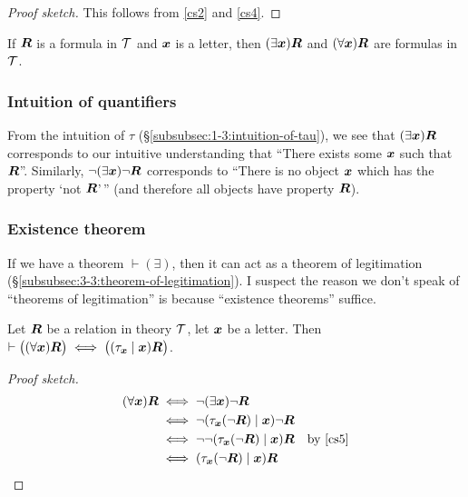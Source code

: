 \begin{proof}[Proof sketch]
This follows from \ref{cs2} and \ref{cs4}.
\end{proof}

\begin{cf}\label{cf11}
If $\boldsymbol{R}$ is a formula in $\mathcal{T}$ and
$\boldsymbol{x}$ is a letter, then
$(\exists\boldsymbol{x})\boldsymbol{R}$ and
$(\forall\boldsymbol{x})\boldsymbol{R}$ are formulas in $\mathcal{T}$.
\end{cf}

\subsubsection{Intuition of quantifiers}
From the intuition of $\tau$ (\S\ref{subsubsec:1-3:intuition-of-tau}),
we see that $(\exists\boldsymbol{x})\boldsymbol{R}$ corresponds to
our intuitive understanding that ``There exists some $\boldsymbol{x}$
such that $\boldsymbol{R}$''. Similarly,
$\neg(\exists\boldsymbol{x})\neg\boldsymbol{R}$ corresponds to
``There is no object $\boldsymbol{x}$ which has the property `not
$\boldsymbol{R}$'\,'' (and therefore all objects have property
$\boldsymbol{R}$).

\subsubsection{Existence theorem}\label{subsubsec:4-1:existence-thms}
If we have a theorem $\vdash(\exists)$, then it can act as a theorem of
legitimation (\S\ref{subsubsec:3-3:theorem-of-legitimation}). I suspect
the reason we don't speak of ``theorems of legitimation'' is because
``existence theorems'' suffice.

\begin{dc}\label{c26}
Let $\boldsymbol{R}$ be a relation in theory $\mathcal{T}$, let
$\boldsymbol{x}$ be a letter. Then $\vdash\bigl((\forall\boldsymbol{x})\boldsymbol{R}\bigr)\iff\bigl((\tau_{\boldsymbol{x}}\mid\boldsymbol{x})\boldsymbol{R}\bigr)$.
\end{dc}

\begin{proof}[Proof sketch]
\begin{align*}
(\forall\boldsymbol{x})\boldsymbol{R} &\iff\neg(\exists\boldsymbol{x})\neg\boldsymbol{R}\\
&\iff\neg(\tau_{\boldsymbol{x}}(\neg\boldsymbol{R})\mid\boldsymbol{x})\neg\boldsymbol{R}\\
&\iff\neg\neg(\tau_{\boldsymbol{x}}(\neg\boldsymbol{R})\mid\boldsymbol{x})\boldsymbol{R}\quad\mbox{by \ref{cs5}}\\
&\iff(\tau_{\boldsymbol{x}}(\neg\boldsymbol{R})\mid\boldsymbol{x})\boldsymbol{R}\qedhere
\end{align*}
\end{proof}

